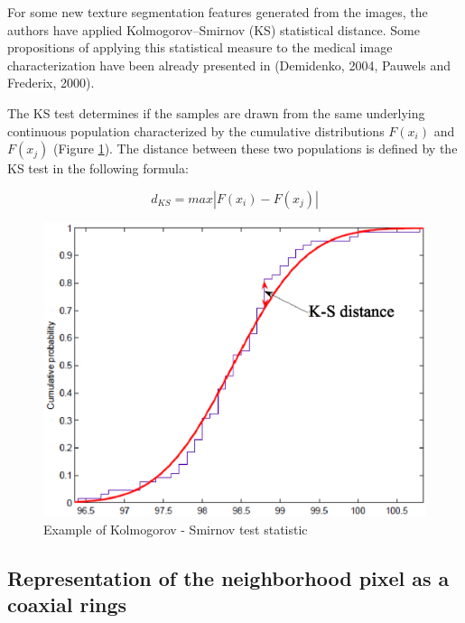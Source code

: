 \documentclass[review,12pt]{elsarticle}
\begin{document}
For some new texture segmentation features generated from the images, the authors have applied Kolmogorov–Smirnov (KS) statistical distance. Some propositions
of applying this statistical measure to the medical image characterization have been already presented in (Demidenko, 2004, Pauwels and Frederix, 2000).

The KS test determines if the samples are drawn from the same underlying continuous population characterized by the cumulative distributions $F(x_{i})$ and $F(x_{j})$ (Figure \ref{fig:KSDistance}). The distance between these two populations is defined by the KS test in the following formula:

\begin{equation}
d_{KS}=max|F(x_{i})-F(x_{j})|
\label{eqKSdistance}
\end{equation}


\begin{figure}
\center
\includegraphics[scale=0.6]{images/KSDistance.eps}
\caption{Example of Kolmogorov - Smirnov test statistic}
\label{fig:KSDistance}
\end{figure}

\subsection{Representation of the neighborhood pixel as a coaxial rings}\label{S3.3}
\end{document}
